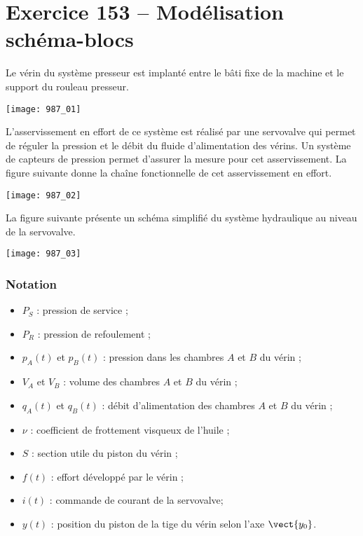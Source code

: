 \section*{Exercice 153 -- Modélisation schéma-blocs}
\setcounter{exo}{0}

Le vérin du système presseur est implanté entre le bâti fixe de la machine et le
support du rouleau presseur.

\begin{center}
\texttt{[image: 987\_01]}%
\end{center}

L’asservissement en effort de ce système est réalisé par une servovalve qui permet de
réguler la pression et le débit du fluide d’alimentation des vérins.
Un système de capteurs de pression permet d’assurer la mesure pour cet asservissement.
La figure suivante donne la chaîne fonctionnelle de cet asservissement en effort.

\begin{center}
\texttt{[image: 987\_02]}%
\end{center}

La figure suivante présente un schéma simplifié du système hydraulique au niveau de la
servovalve.

\begin{center}
\texttt{[image: 987\_03]}%
\end{center}


\subsubsection*{Notation}
\begin{itemize}
\item $P_S$ : pression de service ;
\item $P_R$ : pression de refoulement ;
\item $p_A(t)$ et $p_B(t)$ : pression dans les chambres $A$ et $B$ du vérin ;
\item $V_A$ et $V_B$ : volume des chambres $A$ et $B$ du vérin ;
\item $q_A(t)$ et $q_B(t)$ : débit d’alimentation des chambres $A$ et $B$ du vérin ;
\item $ \nu$  : coefficient de frottement visqueux de l’huile ;
\item $S$ : section utile du piston du vérin ;
\item $f(t)$ : effort développé par le vérin ;
\item $i(t)$ : commande de courant de la servovalve;
\item $y(t)$ : position du piston de la tige du vérin selon l’axe $\vect{y_0}$.
\end{itemize}


